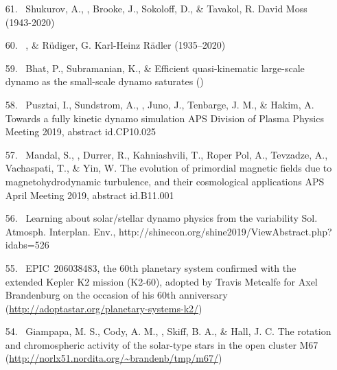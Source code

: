 \begin{itemize}
\item[{61.}~]
Shukurov, A., \Brandenburg, Brooke, J., Sokoloff, D., \& Tavakol, R.
{David Moss (1943-2020)}

\item[{60.}~]
\Brandenburg, \& R\"udiger, G.
{Karl-Heinz R\"adler (1935--2020)}

\item[{59.}~]
Bhat, P., Subramanian, K., \& \Brandenburg{}
{Efficient quasi-kinematic large-scale dynamo as the small-scale dynamo saturates}
()

\item[{58.}~]
Pusztai, I., Sundstrom, A., \Brandenburg, Juno, J., Tenbarge, J. M., \& Hakim, A.
{Towards a fully kinetic dynamo simulation}
{APS Division of Plasma Physics Meeting 2019, abstract id.CP10.025}

\item[{57.}~]
Mandal, S., \Brandenburg, Durrer, R., Kahniashvili, T., Roper Pol, A., Tevzadze, A., Vachaspati, T., \& Yin, W.
{The evolution of primordial magnetic fields due to magnetohydrodynamic turbulence, and their cosmological applications}
{APS April Meeting 2019, abstract id.B11.001}

\item[{56.}~]
\Brandenburg{}
{Learning about solar/stellar dynamo physics from the variability}
{Sol. Atmosph. Interplan. Env., http://shinecon.org/shine2019/ViewAbstract.php?idabs=526}

\item[{55.}~]
EPIC~206038483, the 60th planetary system confirmed with the
extended Kepler K2 mission (K2-60), adopted by Travis Metcalfe
for Axel Brandenburg on the occasion of his 60th anniversary
(\url{http://adoptastar.org/planetary-systems-k2/})

\item[{54.}~]
Giampapa, M. S., Cody, A. M., \Brandenburg, Skiff, B. A., \& Hall, J. C.
{The rotation and chromospheric activity of the solar-type stars in the open cluster M67}
{(\url{http://norlx51.nordita.org/~brandenb/tmp/m67/})}


\end{itemize}
